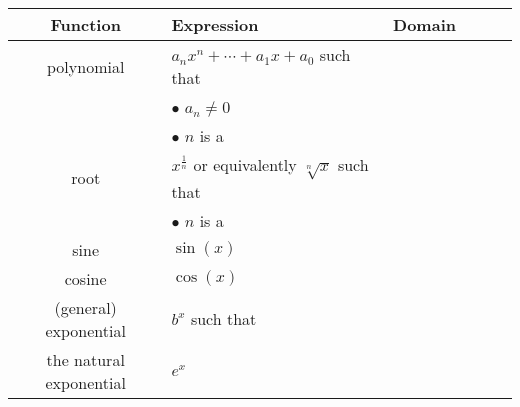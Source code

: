 \documentclass{standalone}
\author{Kelvin Chan}
\begin{document}
\begin{tabular}{Sl|Sl|Sl}
  \textbf{Function} & \textbf{Expression} & \textbf{Domain} \\
  \hline\hline
  polynomial & \(a_{n} x^{n} + \cdots + a_{1} x + a_{0}\) such that & \phantom{all numbers} \\
             & \footnotesize \(\bullet\) \(a_{n} \ne 0\) & \\
             & \footnotesize \(\bullet\) \(n\) is a \phantom{\large non-negative integer} & \\
  \hline
  root       & \(x^{\frac{1}{n}}\) or equivalently \(\sqrt[n]{x}\) such that & \phantom{\(\bullet\) \large non-negative numbers if \(n\) is even} \\
             & \footnotesize \(\bullet\) \(n\) is a \phantom{\large positive integer} & \phantom{\(\bullet\) all numbers if \(n\) is odd} \\
  \hline
  sine       & \(\sin(x)\) & \phantom{all numbers} \\
  cosine       & \(\cos(x)\) & \phantom{all numbers} \\
  \hline
  (general) exponential       & \(b^{x}\) such that \phantom{\(b > 0\)} & \phantom{all numbers} \\
  the natural exponential       & \(e^{x}\) & \phantom{all numbers}
\end{tabular}
\end{document}
